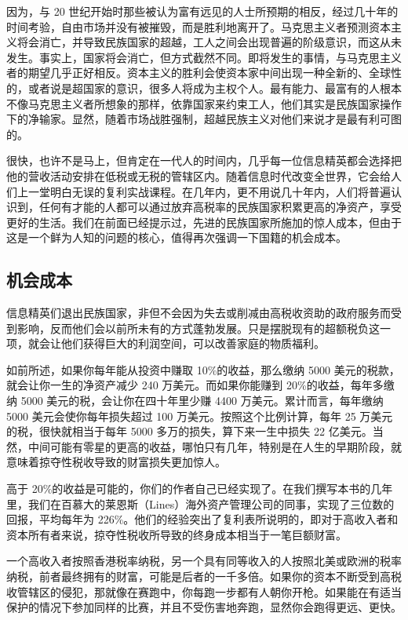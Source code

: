 因为，与 20 世纪开始时那些被认为富有远见的人士所预期的相反，经过几十年的时间考验，自由市场并没有被摧毁，而是胜利地离开了。马克思主义者预测资本主义将会消亡，并导致民族国家的超越，工人之间会出现普遍的阶级意识，而这从未发生。事实上，国家将会消亡，但方式截然不同。即将发生的事情，与马克思主义者的期望几乎正好相反。资本主义的胜利会使资本家中间出现一种全新的、全球性的，或者说是超国家的意识，很多人将成为主权个人。最有能力、最富有的人根本不像马克思主义者所想象的那样，依靠国家来约束工人，他们其实是民族国家操作下的净输家。显然，随着市场战胜强制，超越民族主义对他们来说才是最有利可图的。

很快，也许不是马上，但肯定在一代人的时间内，几乎每一位信息精英都会选择把他的营收活动安排在低税或无税的管辖区内。随着信息时代改变全世界，它会给人们上一堂明白无误的复利实战课程。在几年内，更不用说几十年内，人们将普遍认识到，任何有才能的人都可以通过放弃高税率的民族国家积累更高的净资产，享受更好的生活。我们在前面已经提示过，先进的民族国家所施加的惊人成本，但由于这是一个鲜为人知的问题的核心，值得再次强调一下国籍的机会成本。

\subsection{机会成本}
信息精英们退出民族国家，非但不会因为失去或削减由高税收资助的政府服务而受到影响，反而他们会以前所未有的方式蓬勃发展。只是摆脱现有的超额税负这一项，就会让他们获得巨大的利润空间，可以改善家庭的物质福利。

如前所述，如果你每年能从投资中赚取 10\%的收益，那么缴纳 5000 美元的税款，就会让你一生的净资产减少 240 万美元。而如果你能赚到 20\%的收益，每年多缴纳 5000 美元的税，会让你在四十年里少赚 4400 万美元。累计而言，每年缴纳5000 美元会使你每年损失超过 100 万美元。按照这个比例计算，每年 25 万美元的税，很快就相当于每年 5000 多万的损失，算下来一生中损失 22 亿美元。当然，中间可能有零星的更高的收益，哪怕只有几年，特别是在人生的早期阶段，就意味着掠夺性税收导致的财富损失更加惊人。

高于 20\%的收益是可能的，你们的作者自己已经实现了。在我们撰写本书的几年里，我们在百慕大的莱恩斯（Lines）海外资产管理公司的同事，实现了三位数的回报，平均每年为 226\%。他们的经验突出了复利表所说明的，即对于高收入者和资本所有者来说，掠夺性税收所导致的终身成本相当于一笔巨额财富。

一个高收入者按照香港税率纳税，另一个具有同等收入的人按照北美或欧洲的税率纳税，前者最终拥有的财富，可能是后者的一千多倍。如果你的资本不断受到高税收管辖区的侵犯，那就像在赛跑中，你每跑一步都有人朝你开枪。如果能在有适当保护的情况下参加同样的比赛，并且不受伤害地奔跑，显然你会跑得更远、更快。

